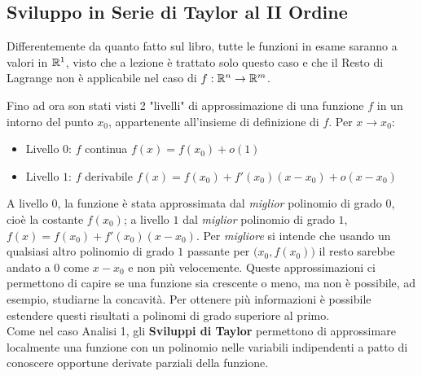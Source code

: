 \subsection{Sviluppo in Serie di Taylor al II Ordine}
\begin{note}
	Differentemente da quanto fatto sul libro, tutte le funzioni in esame saranno a valori in $\mathbb{R}^1$, visto che a lezione è trattato solo questo caso e che il Resto di Lagrange non è applicabile nel caso di $f: \mathbb{R}^n \to \mathbb{R}^m$.
\end{note}
Fino ad ora son stati visti 2 "livelli" di approssimazione di una funzione $f$ in un intorno del punto $x_0$, appartenente all'insieme di definizione di $f$. Per $x \to x_0$:
\begin{itemize}
	\item Livello $0$: \quad $f$ continua \qquad $f(x) = f(x_0) + o(1)$
	\item Livello $1$: \quad $f$ derivabile \qquad $f(x) = f(x_0) + f'(x_0)(x - x_0) + o(x - x_0)$
\end{itemize}
A livello $0$, la funzione è stata approssimata dal \textit{miglior} polinomio di grado $0$, cioè la costante $f(x_0)$; a livello $1$ dal \textit{miglior} polinomio di grado $1$, $f(x) = f(x_0) + f'(x_0)(x - x_0)$. Per \textit{migliore} si intende che usando un qualsiasi altro polinomio di grado $1$ passante per $\bigl( x_0, f(x_0) \bigr)$ il resto sarebbe andato a $0$ come $x - x_0$ e non più velocemente. Queste approssimazioni ci permettono di capire se una funzione sia crescente o meno, ma non è possibile, ad esempio, studiarne la concavità. Per ottenere più informazioni è possibile estendere questi risultati a polinomi di grado superiore al primo.\\
Come nel caso Analisi 1, gli \textbf{Sviluppi di Taylor} permettono di approssimare localmente una funzione con un polinomio nelle variabili indipendenti a patto di conoscere opportune derivate parziali della funzione.

